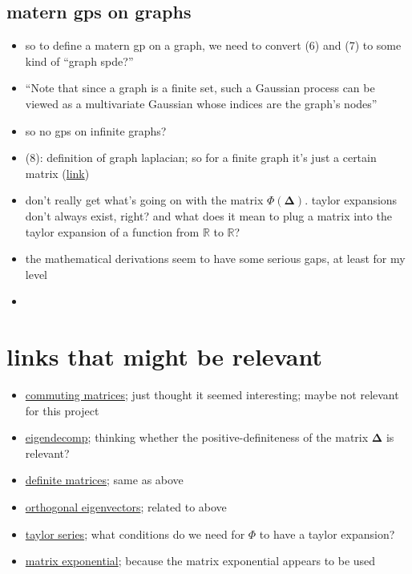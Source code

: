 \documentclass[10pt]{article}
\begin{document}
\subsection{matern gps on graphs}

\begin{itemize}
    \item so to define a matern gp on a graph, we need to convert (6) and (7) to some kind of ``graph spde?''
    \item ``Note that since a graph is a finite set, such a Gaussian process can be viewed as a multivariate Gaussian whose indices are the graph's nodes''
    \item so no gps on infinite graphs?
    \item (8): definition of graph laplacian; so for a finite graph it's just a certain matrix (\href{https://mbernste.github.io/posts/laplacian_matrix/}{link})
    \item don't really get what's going on with the matrix $\Phi(\bm{\Delta})$. taylor expansions don't always exist, right? and what does it mean to plug a matrix into the taylor expansion of a function from $\mathbb R$ to $\mathbb R$?
    \item the mathematical derivations seem to have some serious gaps, at least for my level
    \item 
\end{itemize}

\section{links that might be relevant}

\begin{itemize}
    \item \href{https://math.stackexchange.com/questions/6258/matrices-commute-if-and-only-if-they-share-a-common-basis-of-eigenvectors}{commuting matrices}; just thought it seemed interesting; maybe not relevant for this project
    \item \href{https://en.wikipedia.org/wiki/Eigendecomposition_of_a_matrix#Real_symmetric_matrices}{eigendecomp}; thinking whether the positive-definiteness of the matrix $\bm{\Delta}$ is relevant?
    \item \href{https://en.wikipedia.org/wiki/Definite_matrix}{definite matrices}; same as above
    \item \href{https://math.stackexchange.com/questions/82467/eigenvectors-of-real-symmetric-matrices-are-orthogonal}{orthogonal eigenvectors}; related to above
    \item \href{https://en.wikipedia.org/wiki/Taylor_series#:~:text=The%20partial%20sum%20formed%20by,more%20accurate%20as%20n%20increases.}{taylor series}; what conditions do we need for $\Phi$ to have a taylor expansion?
    \item \href{https://en.wikipedia.org/wiki/Matrix_exponential}{matrix exponential}; because the matrix exponential appears to be used
\end{itemize}








\printbibliography
\end{document}
